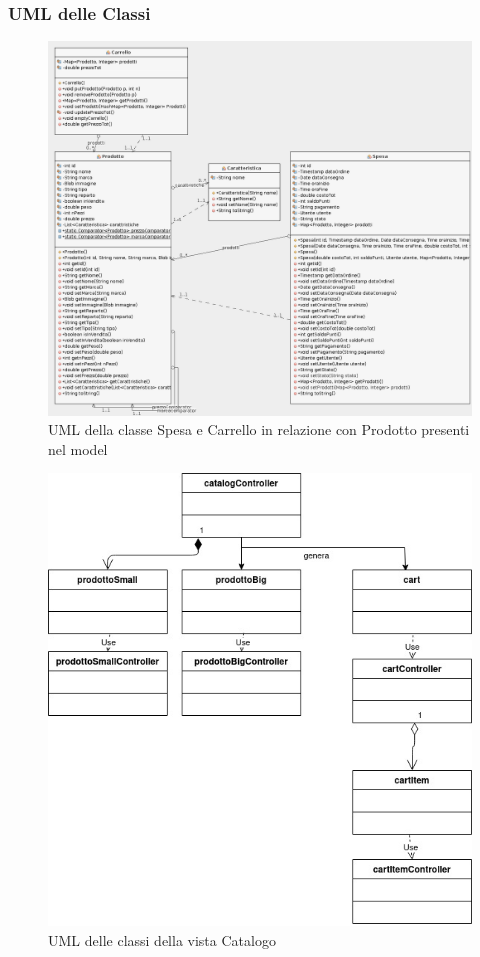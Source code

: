 \documentclass{article}
\begin{document}
\subsubsection{UML delle Classi}
\begin{figure}[h!]
	\centering
	\includegraphics[width=\textwidth]{UmlSpesa.png}
	\caption{UML della classe Spesa e Carrello in relazione con Prodotto presenti nel model}
	\label{fig:UmlSpesa}
\end{figure}

\begin{figure}[h!]
	\centering
	\includegraphics[width=\textwidth]{UmlCatalog.jpg}
	\caption{UML delle classi della vista Catalogo}
	\label{fig:UmlCatalog}
\end{figure}
\end{document}
